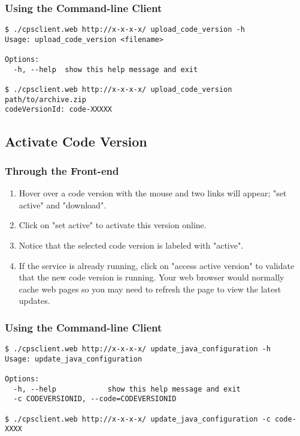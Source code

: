 \documentclass[10pt]{article}
\newenvironment{framedbox}[1]%
{\begin{framed}
 \begingroup
 \fontsize{#1}{#1}\selectfont
}
{
 \endgroup
 \end{framed}
}
\begin{document}
\subsubsection{Using the Command-line Client}
\begin{framedbox}{8pt}\begin{verbatim}
$ ./cpsclient.web http://x-x-x-x/ upload_code_version -h
Usage: upload_code_version <filename>

Options:
  -h, --help  show this help message and exit

$ ./cpsclient.web http://x-x-x-x/ upload_code_version path/to/archive.zip
codeVersionId: code-XXXXX
\end{verbatim}\end{framedbox}

\subsection{Activate Code Version}
\subsubsection{Through the Front-end}
\begin{enumerate}
\item Hover over a code version with the mouse and two links will appear;
      "set active" and "download".
\item Click on "set active" to activate this version online.
\item Notice that the selected code version is labeled with "active".
\item If the service is already running, click on "access active version" to
      validate that the new code version is running. Your web browser would
      normally cache web pages so you may need to refresh the page to view
      the latest updates.
\end{enumerate}

\subsubsection{Using the Command-line Client}
\begin{framedbox}{8pt}\begin{verbatim}
$ ./cpsclient.web http://x-x-x-x/ update_java_configuration -h
Usage: update_java_configuration

Options:
  -h, --help            show this help message and exit
  -c CODEVERSIONID, --code=CODEVERSIONID

$ ./cpsclient.web http://x-x-x-x/ update_java_configuration -c code-XXXX
\end{verbatim}\end{framedbox}
\end{document}
